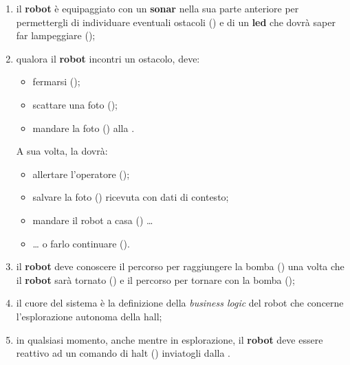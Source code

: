 \begin{enumerate}
  \item
    il \textbf{robot } è equipaggiato con un \textbf{sonar} nella sua parte anteriore per permettergli di individuare eventuali ostacoli () e di un \textbf{led} che dovrà saper far lampeggiare ();

  \item
    qualora il \textbf{robot } incontri un ostacolo, deve:
    \begin{itemize}
      \item fermarsi ();
      \item scattare una foto ();
      \item mandare la foto () alla \textbf{}.
    \end{itemize}
    A sua volta, la \textbf{} dovrà:
    \begin{itemize}
      \item allertare l'operatore ();
      \item salvare la foto () ricevuta con dati di contesto;
      \item mandare il robot a casa () \ldots{}
      \item \ldots{} o farlo continuare ().
    \end{itemize}

  \item
    il \textbf{robot } deve conoscere il percorso per raggiungere la bomba () una volta che il \textbf{robot } sarà tornato () e il percorso per tornare con la bomba ();

  \item
    il cuore del sistema è la definizione della \textit{business logic} del robot che concerne l'esplorazione autonoma della hall;

  \item
    in qualsiasi momento, anche mentre in esplorazione, il \textbf{robot } deve essere reattivo ad un comando di halt () inviatogli dalla \textbf{}.
\end{enumerate}

